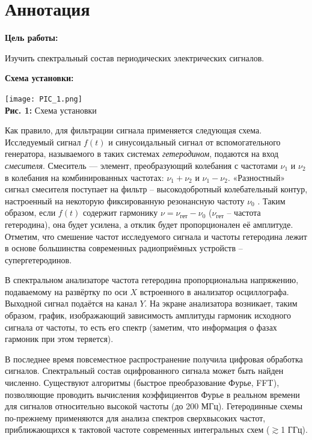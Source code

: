 \documentclass[12pt,a4paper]{scrartcl}
\begin{document}
	\section{Аннотация}
	
	\textbf{Цель работы: }
	
	Изучить спектральный состав периодических электрических сигналов.
	
	\textbf{Схема установки:}
	\begin{center}
		\texttt{[image: PIC\_1.png]}
		\\\textbf{Рис. 1:} Схема установки
	\end{center}	
		
	Как правило, для фильтрации сигнала применяется следующая схема. Исследуемый сигнал $f(t)$ и синусоидальный сигнал от вспомогательного генератора, называемого в таких системах \textit{гетеродином}, подаются на вход \textit{смесителя}. Смеситель — элемент, преобразующий колебания с частотами $\nu_1$ и $\nu_2$ в колебания на комбинированных частотах: $\nu_1 + \nu_2$ и $\nu_1 - \nu_2$. «Разностный» сигнал смесителя поступает на фильтр -- высокодобротный колебательный контур, настроенный на некоторую фиксированную резонансную частоту $\nu_0$ . Таким образом, если $f(t)$ содержит гармонику $\nu = \nu_{\text{гет}} - \nu_0$ ($\nu_{\text{гет}}$ -- частота гетеродина), она будет	усилена, а отклик будет пропорционален её амплитуде. Отметим, что смешение частот исследуемого сигнала и частоты гетеродина лежит в основе большинства современных радиоприёмных устройств -- супергетеродинов.
	
	В спектральном анализаторе частота гетеродина пропорциональна напряжению, подаваемому на развёртку по оси $X$ встроенного в анализатор осциллографа. Выходной сигнал подаётся на канал $Y$. На экране анализатора возникает, таким образом, график, изображающий зависимость амплитуды гармоник исходного сигнала от частоты, то есть его спектр (заметим, что информация о фазах гармоник при этом теряется).
	
	В последнее время повсеместное распространение получила цифровая обработка сигналов. Спектральный состав оцифрованного сигнала может быть найден численно. Существуют алгоритмы (быстрое преобразование Фурье, FFT), позволяющие проводить вычисления коэффициентов Фурье в реальном времени для сигналов относительно высокой	частоты (до 200 МГц). Гетеродинные схемы по-прежнему применяются для анализа спектров сверхвысоких частот, приближающихся к тактовой частоте современных интегральных схем ($\gtrsim$1 ГГц).
		
\end{document}
